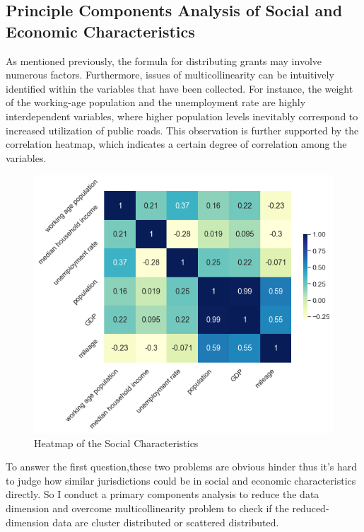 \subsection{Principle Components Analysis of Social and Economic Characteristics}
As mentioned previously, the formula for distributing grants may involve numerous factors. Furthermore, issues of multicollinearity can be intuitively identified within the variables that have been collected. For instance, the weight of the working-age population and the unemployment rate are highly interdependent variables, where higher population levels inevitably correspond to increased utilization of public roads. This observation is further supported by the correlation heatmap, which indicates a certain degree of correlation among the variables.
\begin{figure}[H]
    \centering
    \includegraphics[scale=0.7]{Chapter-3/Figures/heatmap.png}
    \caption[Heatmap of the Social Characteristics]{Heatmap of the Social Characteristics
        \texttt{} }
    \label{heatmap}
\end{figure}

To answer the first question,these two problems are obvious hinder thus it's hard to judge how similar jurisdictions could be in social and economic characteristics directly. So I conduct a primary components analysis to reduce the data dimension and overcome multicollinearity problem to check if the reduced-dimension data are cluster distributed or scattered distributed.

